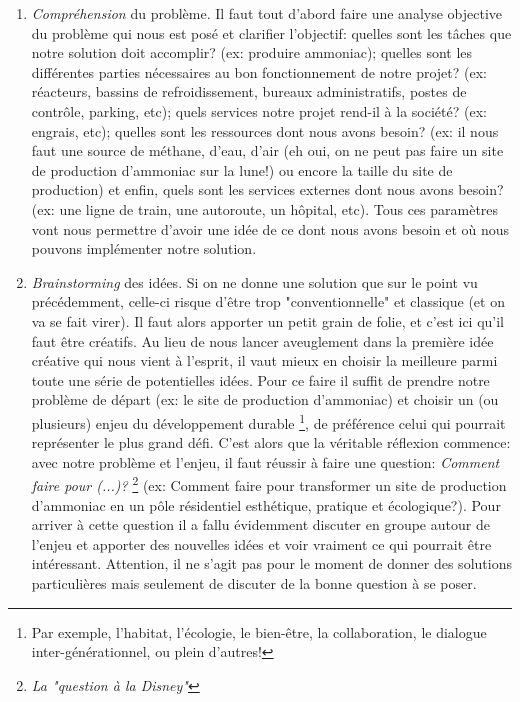 \begin{enumerate}

\item \textit{Compréhension} du problème. Il faut tout d'abord faire une analyse objective du problème qui nous est posé et clarifier l'objectif: quelles sont les tâches que notre solution doit accomplir? (ex: produire ammoniac); quelles sont les différentes parties nécessaires au bon fonctionnement de notre projet? (ex: réacteurs, bassins de refroidissement, bureaux administratifs, postes de contrôle, parking, etc); quels services notre projet rend-il à la société? (ex: engrais, etc); quelles sont les ressources dont nous avons besoin? (ex: il nous faut une source de méthane, d'eau, d'air (eh oui, on ne peut pas faire un site de production d'ammoniac sur la lune!) ou encore la taille du site de production) et enfin, quels sont les services externes dont nous avons besoin? (ex: une ligne de train, une autoroute, un hôpital, etc). Tous ces paramètres vont nous permettre d'avoir une idée de ce dont nous avons besoin et où nous pouvons implémenter notre solution.

\item \textit{Brainstorming} des idées. Si on ne donne une solution que sur le point vu précédemment, celle-ci risque d’être trop "conventionnelle" et classique (et on va se fait virer). Il faut alors apporter un petit grain de folie, et c'est ici qu'il faut être créatifs. Au lieu de nous lancer aveuglement dans la première idée créative qui nous vient à l'esprit, il vaut mieux en choisir la meilleure parmi toute une série de potentielles idées. Pour ce faire il suffit de prendre notre problème de départ (ex: le site de production d'ammoniac) et choisir un (ou plusieurs) enjeu du développement durable \footnote{Par exemple, l'habitat, l’écologie, le bien-être, la collaboration, le dialogue inter-générationnel, ou plein d'autres!}, de préférence celui qui pourrait représenter le plus grand défi. C'est alors que la véritable réflexion commence: avec notre problème et l'enjeu, il faut réussir à faire une question: \textit{Comment faire pour (...)?} \footnote{\textit{La "question à la Disney"}} (ex: Comment faire pour transformer un site de production d'ammoniac en un pôle résidentiel esthétique, pratique et écologique?). Pour arriver à cette question il a fallu évidemment discuter en groupe autour de l'enjeu et apporter des nouvelles idées et voir vraiment ce qui pourrait être intéressant. Attention, il ne s'agit pas pour le moment de donner des solutions particulières mais seulement de discuter de la bonne question à se poser.


\end{enumerate}
